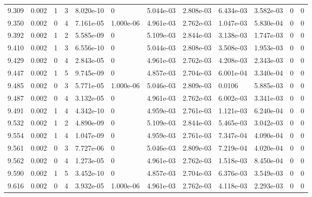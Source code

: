 \documentclass[preview]{standalone}
\begin{document}
{{{{{{{{{{{{\begin{tabular}{L{1.2cm}C{1.2cm} C{0.3cm}C{0.5cm} C{1.4cm}C{1.4cm} C{1.4cm}C{1.4cm} C{1.6cm}C{1.6cm} C{1.6cm}C{1.6cm}}
  9.309  &  0.002  & 1     &  3 &  8.020e-10  & 0  &  5.044e-03&   2.808e-03& 6.434e-03 & 3.582e-03   &  0 & 0  \\ 
  9.350  &  0.002  & 0     &  4 &  7.161e-05  & 1.000e-06  &  4.961e-03&   2.762e-03& 1.047e-03 & 5.830e-04   &  0 & 0  \\ 
  9.392  &  0.002  & 1     &  2 &  5.585e-09  & 0  &  5.109e-03&   2.844e-03& 3.138e-03 & 1.747e-03   &  0 & 0  \\ 
  9.410  &  0.002  & 1     &  3 &  6.556e-10  & 0  &  5.044e-03&   2.808e-03& 3.508e-03 & 1.953e-03   &  0 & 0  \\ 
  9.429  &  0.002  & 0     &  4 &  2.843e-05  & 0  &  4.961e-03&   2.762e-03& 4.208e-03 & 2.343e-03   &  0 & 0  \\ 
  9.447  &  0.002  & 1     &  5 &  9.745e-09  & 0  &  4.857e-03&   2.704e-03& 6.001e-04 & 3.340e-04   &  0 & 0  \\ 
  9.485  &  0.002  & 0     &  3 &  5.771e-05  & 1.000e-06  &  5.046e-03&   2.809e-03& 0.0106 & 5.885e-03   &  0 & 0  \\ 
  9.487  &  0.002  & 0     &  4 &  3.132e-05  & 0  &  4.961e-03&   2.762e-03& 6.002e-03 & 3.341e-03   &  0 & 0  \\ 
  9.491  &  0.002  & 1     &  4 &  4.342e-10  & 0  &  4.959e-03&   2.761e-03& 1.121e-03 & 6.240e-04   &  0 & 0  \\ 
  9.532  &  0.002  & 1     &  2 &  4.890e-09  & 0  &  5.109e-03&   2.844e-03& 5.465e-03 & 3.042e-03   &  0 & 0  \\ 
  9.554  &  0.002  & 1     &  4 &  1.047e-09  & 0  &  4.959e-03&   2.761e-03& 7.347e-04 & 4.090e-04   &  0 & 0  \\ 
  9.561  &  0.002  & 0     &  3 &  7.727e-06  & 0  &  5.046e-03&   2.809e-03& 7.219e-04 & 4.020e-04   &  0 & 0  \\ 
  9.562  &  0.002  & 0     &  4 &  1.273e-05  & 0  &  4.961e-03&   2.762e-03& 1.518e-03 & 8.450e-04   &  0 & 0  \\ 
  9.590  &  0.002  & 1     &  5 &  3.452e-10  & 0  &  4.857e-03&   2.704e-03& 6.376e-03 & 3.549e-03   &  0 & 0  \\ 
  9.616  &  0.002  & 0     &  4 &  3.932e-05  & 1.000e-06  &  4.961e-03&   2.762e-03& 4.118e-03 & 2.293e-03   &  0 & 0  \\ 
\hline 
\end{tabular} 

}}}}}}}}}}}}
\end{document}

